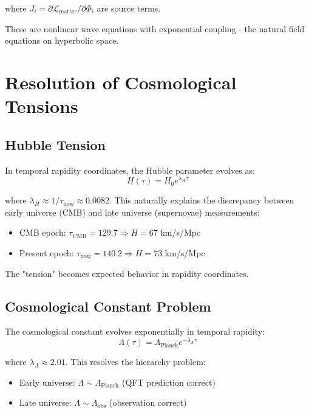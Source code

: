 \documentclass[12pt,a4paper]{article}
\begin{document}
where $J_i = \partial \mathcal{L}_{\text{matter}}/\partial \Phi_i$ are source terms.

These are nonlinear wave equations with exponential coupling - the natural field 
equations on hyperbolic space.

\section{Resolution of Cosmological Tensions}

\subsection{Hubble Tension}

In temporal rapidity coordinates, the Hubble parameter evolves as:
\begin{equation}
H(\tau) = H_0 e^{\lambda_H \tau}
\end{equation}

where $\lambda_H \approx 1/\tau_{\text{now}} \approx 0.0082$. This naturally 
explains the discrepancy between early universe (CMB) and late universe 
(supernovae) measurements:
\begin{itemize}
    \item CMB epoch: $\tau_{\text{CMB}} = 129.7 \Rightarrow H = 67$ km/s/Mpc
    \item Present epoch: $\tau_{\text{now}} = 140.2 \Rightarrow H = 73$ km/s/Mpc
\end{itemize}

The "tension" becomes expected behavior in rapidity coordinates.

\subsection{Cosmological Constant Problem}

The cosmological constant evolves exponentially in temporal rapidity:
\begin{equation}
\Lambda ( \tau ) = \Lambda _ { \text{Planck} } e ^ { - \lambda _ { \Lambda } \tau }
\end{equation}

where $\lambda_\Lambda \approx 2.01$. This resolves the hierarchy problem:
\begin{itemize}
    \item Early universe: $\Lambda \sim \Lambda_{\text{Planck}}$ (QFT prediction correct)
    \item Late universe: $\Lambda \sim \Lambda_{\text{obs}}$ (observation correct)
\end{itemize}
\end{document}
